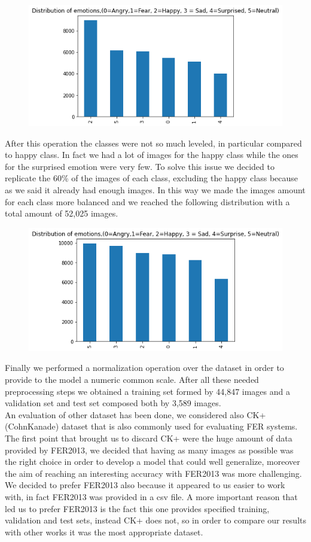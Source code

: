\documentclass[10pt,twocolumn,letterpaper]{article}
\begin{document}
\begin{figure}[H]
   \centering
   \includegraphics[width=1\linewidth]{./immagini/6_classi.png}
   \label{figure:histogram2}
\end{figure}
After this operation the classes were not so much leveled, in particular compared to happy class. In fact we had a lot of images for the happy class while the ones for the surprised emotion were very few. To solve this issue we decided to replicate the 60\% of the images of each class, excluding the happy class because as we said it already had enough images. In this way we made the images amount for each class more balanced and we reached the following distribution with a total amount of 52,025 images.
\begin{figure}[H]
   \centering
   \includegraphics[width=1\linewidth]{./immagini/classi_bilanciate.png}
\end{figure}
Finally we performed a normalization operation over the dataset in order to provide to the model a numeric common scale. After all these needed preprocessing steps we obtained a training set formed by 44,847 images and a validation set and test set composed both by 3,589 images.\\
An evaluation of other dataset has been done, we considered also CK+ (CohnKanade) dataset that is also commonly used for evaluating FER systems. The first point that brought us to discard CK+ were the huge amount of data provided by FER2013, we decided that having as many images as possible was the right choice in order to develop a model that could well generalize, moreover the aim of reaching an interesting accuracy with FER2013 was more challenging. We decided to prefer FER2013 also because it appeared to us easier to work with, in fact FER2013 was provided in a csv file. A more important reason that led us to prefer FER2013 is the fact this one provides specified training, validation and test sets, instead CK+ does not, so in order to compare our results with other works it was the most appropriate dataset.
\end{document}
